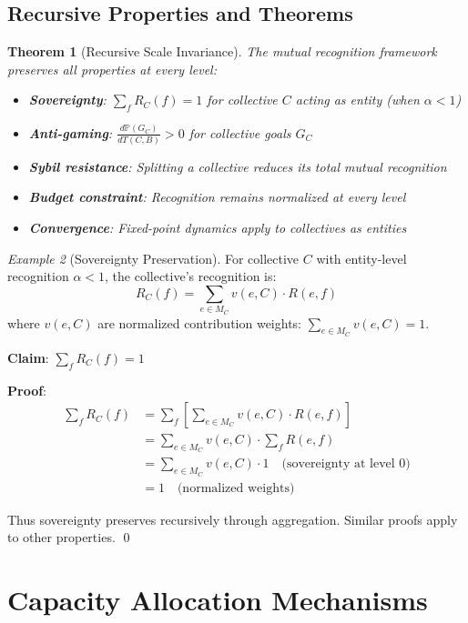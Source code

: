 \documentclass[11pt,a4paper]{article}
\newtheorem{theorem}{Theorem}[section]
\theoremstyle{definition}
\theoremstyle{remark}
\newtheorem{example}[theorem]{Example}
\begin{document}
\subsection{Recursive Properties and Theorems}

\begin{theorem}[Recursive Scale Invariance]
The mutual recognition framework preserves all properties at every level:
\begin{itemize}
\item \textbf{Sovereignty}: $\sum_f R_C(f) = 1$ for collective $C$ acting as entity (when $\alpha < 1$)
\item \textbf{Anti-gaming}: $\frac{d\mathbb{P}(G_C)}{dT(C,B)} > 0$ for collective goals $G_C$
\item \textbf{Sybil resistance}: Splitting a collective reduces its total mutual recognition
\item \textbf{Budget constraint}: Recognition remains normalized at every level
\item \textbf{Convergence}: Fixed-point dynamics apply to collectives as entities
\end{itemize}
\end{theorem}

\begin{example}[Sovereignty Preservation]
For collective $C$ with entity-level recognition $\alpha < 1$, the collective's recognition is:
\[ R_C(f) = \sum_{e \in M_C} v(e,C) \cdot R(e,f) \]
where $v(e,C)$ are normalized contribution weights: $\sum_{e \in M_C} v(e,C) = 1$.

\textbf{Claim}: $\sum_f R_C(f) = 1$

\textbf{Proof}:
\begin{align*}
\sum_f R_C(f) &= \sum_f \left[ \sum_{e \in M_C} v(e,C) \cdot R(e,f) \right] \\
&= \sum_{e \in M_C} v(e,C) \cdot \sum_f R(e,f) \\
&= \sum_{e \in M_C} v(e,C) \cdot 1 \quad \text{(sovereignty at level 0)} \\
&= 1 \quad \text{(normalized weights)}
\end{align*}

Thus sovereignty preserves recursively through aggregation. Similar proofs apply to other properties. \qed
\end{example}

\section{Capacity Allocation Mechanisms}
\end{document}
